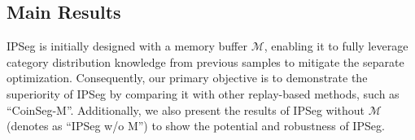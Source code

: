 \subsection{Main Results}



IPSeg is initially designed with a memory buffer \(\mathcal{M}\), enabling it to fully leverage category distribution knowledge from previous samples to mitigate the separate optimization. Consequently, our primary objective is to demonstrate the superiority of IPSeg by comparing it with other replay-based methods, such as ``CoinSeg-M''. Additionally, we also present the results of IPSeg without \(\mathcal{M}\) (denotes as ``IPSeg w/o M'') to show the potential and robustness of IPSeg.

\begin{table*}[t]
    \centering
        \caption{Comparison with state-of-the-art methods on ADE20K dataset. \textsuperscript{†} denotes the result is reproduced using the official code with Swin-B backbone. \textsuperscript{*} denotes the results from a longer training schedule of 100 epochs, while 60 epochs in ours.}

\end{table*}
